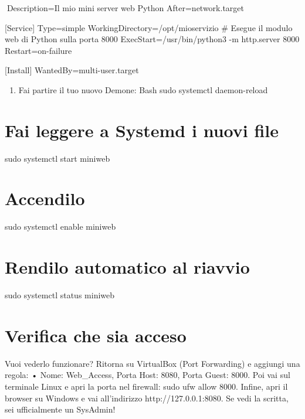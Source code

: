 \documentclass[11pt,a4paper]{article}
\providecommand{\tightlist}{%
  \setlength{\itemsep}{0pt}\setlength{\parskip}{0pt}}
\begin{document}
Description=Il mio mini server web Python After=network.target

{[}Service{]} Type=simple WorkingDirectory=/opt/mioservizio \# Esegue il
modulo web di Python sulla porta 8000 ExecStart=/usr/bin/python3 -m
http.server 8000 Restart=on-failure

{[}Install{]} WantedBy=multi-user.target

\begin{enumerate}
\def\labelenumi{\arabic{enumi}.}
\setcounter{enumi}{3}
\tightlist
\item
  Fai partire il tuo nuovo Demone: Bash sudo systemctl daemon-reload
\end{enumerate}

\section{Fai leggere a Systemd i nuovi
file}\label{fai-leggere-a-systemd-i-nuovi-file}

sudo systemctl start miniweb

\section{Accendilo}\label{accendilo}

sudo systemctl enable miniweb

\section{Rendilo automatico al
riavvio}\label{rendilo-automatico-al-riavvio}

sudo systemctl status miniweb

\section{Verifica che sia acceso}\label{verifica-che-sia-acceso}

Vuoi vederlo funzionare? Ritorna su VirtualBox (Port Forwarding) e
aggiungi una regola: • Nome: Web\_Access, Porta Host: 8080, Porta Guest:
8000. Poi vai sul terminale Linux e apri la porta nel firewall: sudo ufw
allow 8000. Infine, apri il browser su Windows e vai all'indirizzo
http://127.0.0.1:8080. Se vedi la scritta, sei ufficialmente un
SysAdmin!


\end{document}
